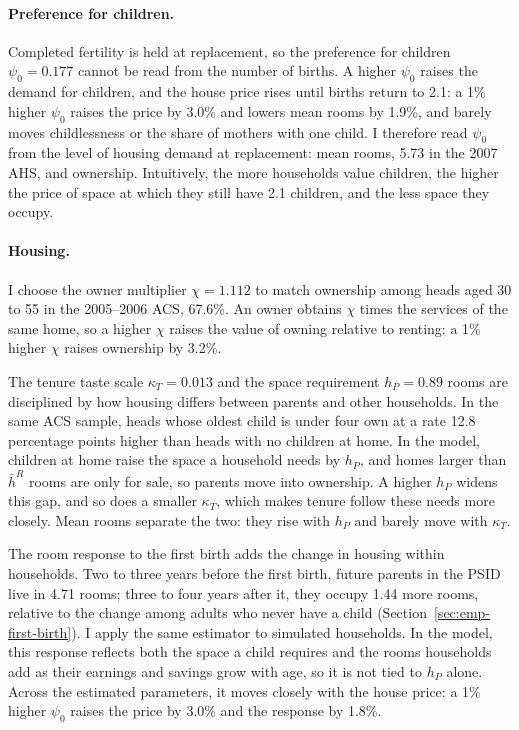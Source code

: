 \paragraph{Preference for children.}
Completed fertility is held at replacement, so the preference for children
$\psi_0=0.177$ cannot be read from the number of births. A higher $\psi_0$
raises the demand for children, and the house price rises until births
return to 2.1: a 1\% higher $\psi_0$ raises the price by 3.0\% and lowers
mean rooms by 1.9\%, and barely moves childlessness or the share of mothers
with one child. I therefore read $\psi_0$ from the level of housing demand at
replacement: mean rooms, 5.73 in the 2007 AHS, and ownership. Intuitively,
the more households value children, the higher the price of space at which
they still have 2.1 children, and the less space they occupy.

\paragraph{Housing.}
I choose the owner multiplier $\chi=1.112$ to match ownership among heads
aged 30 to 55 in the 2005--2006 ACS, 67.6\%. An owner obtains $\chi$ times
the services of the same home, so a higher $\chi$ raises the value of owning
relative to renting: a 1\% higher $\chi$ raises ownership by 3.2\%.

The tenure taste scale $\kappa_T=0.013$ and the space requirement
$h_P=0.89$ rooms are disciplined by how housing differs between parents and
other households. In the same ACS sample, heads whose oldest child is under
four own at a rate 12.8 percentage points higher than heads with no children
at home. In the model, children at home raise the space a household needs by
$h_P$, and homes larger than $\bar h^R$ rooms are only for sale, so parents
move into ownership. A higher $h_P$ widens this gap, and so does a smaller
$\kappa_T$, which makes tenure follow these needs more closely. Mean rooms
separate the two: they rise with $h_P$ and barely move with $\kappa_T$.

The room response to the first birth adds the change in housing within
households. Two to three years before the first birth, future parents in the
PSID live in 4.71 rooms; three to four years after it, they occupy 1.44 more
rooms, relative to the change among adults who never have a child
(Section~\ref{sec:emp-first-birth}). I apply the same estimator to simulated
households. In the model, this response reflects both the space a child
requires and the rooms households add as their earnings and savings grow
with age, so it is not tied to $h_P$ alone. Across the estimated parameters,
it moves closely with the house price: a 1\% higher $\psi_0$ raises the
price by 3.0\% and the response by 1.8\%.


